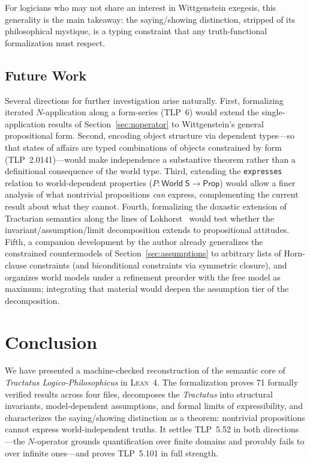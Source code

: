 \documentclass[10pt, letterpaper]{article}
\theoremstyle{definition}
\theoremstyle{remark}
\newcommand{\Sach}{\mathsf{S}}
\newcommand{\World}{\mathsf{World}}
\newcommand{\Prop}{\mathsf{Prop}}
\newcommand{\Lean}{\textsc{Lean}}
\begin{document}
For logicians who may not share an interest in Wittgenstein
exegesis, this generality is the main takeaway: the
saying/showing distinction, stripped of its philosophical
mystique, is a typing constraint that any truth-functional
formalization must respect.

\subsection{Future Work}
\label{sec:future}

Several directions for further investigation arise naturally.
First, formalizing iterated $N$-application along a form-series
(TLP~6) would extend the single-application results of
Section~\ref{sec:noperator} to Wittgenstein's general
propositional form.
Second, encoding object structure via dependent types---so
that states of affairs are typed combinations of objects
constrained by form (TLP~2.0141)---would make independence
a substantive theorem rather than a definitional consequence
of the world type.
Third, extending the \texttt{expresses} relation to
world-dependent properties ($P : \World\;\Sach \to \Prop$)
would allow a finer analysis of what nontrivial propositions
\emph{can} express, complementing the current result about
what they cannot.
Fourth, formalizing the doxastic extension of Tractarian
semantics along the lines of Lokhorst~\cite{lokhorst1988}
would test whether the invariant/assumption/limit decomposition
extends to propositional attitudes.
Fifth, a companion development by the author already generalizes
the constrained countermodels of Section~\ref{sec:assumptions}
to arbitrary lists of Horn-clause constraints (and biconditional
constraints via symmetric closure), and organizes world models
under a refinement preorder with the free model as maximum;
integrating that material would deepen the assumption tier of
the decomposition.

\section{Conclusion}
\label{sec:conclusion}

We have presented a machine-checked reconstruction of the
semantic core of \emph{Tractatus Logico-Philosophicus} in
\Lean~4.  The formalization proves 71 formally verified results
across four files, decomposes the
\emph{Tractatus} into structural invariants, model-dependent
assumptions, and formal limits of expressibility, and
characterizes the saying/showing distinction as a theorem:
nontrivial propositions cannot express world-independent truths.
It settles TLP~5.52 in both directions---the $N$-operator grounds
quantification over finite domains and provably fails to over
infinite ones---and proves TLP~5.101 in full strength.
\end{document}
